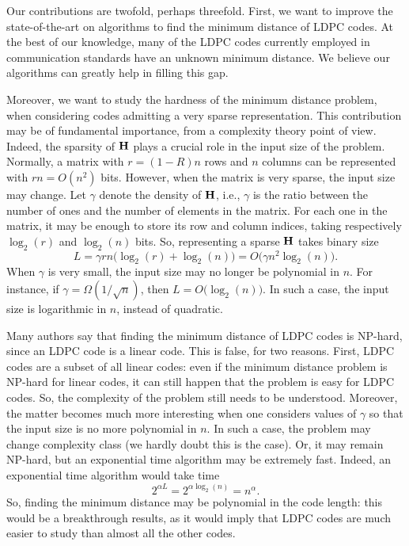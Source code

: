 Our contributions are twofold, perhaps threefold.
First, we want to improve the state-of-the-art on algorithms to find the minimum distance of LDPC codes.
At the best of our knowledge, many of the LDPC codes currently employed in communication standards have an unknown minimum distance.
We believe our algorithms can greatly help in filling this gap.

Moreover, we want to study the hardness of the minimum distance problem, when considering codes admitting a very sparse representation.
This contribution may be of fundamental importance, from a complexity theory point of view.
Indeed, the sparsity of $\mathbf H$ plays a crucial role in the input size of the problem.
Normally, a matrix with $r = (1-R)n$ rows and $n$ columns can be represented with $rn = O(n^2)$ bits.
However, when the matrix is very sparse, the input size may change.
Let $\gamma$ denote the density of $\mathbf H$, i.e., $\gamma$ is the ratio between the number of ones and the number of elements in the matrix.
For each one in the matrix, it may be enough to store its row and column indices, taking respectively $\log_2(r)$ and $\log_2(n)$ bits.
So, representing a sparse $\mathbf H$ takes binary size
$$L = \gamma rn \big(\log_2(r)+\log_2(n)\big) = O\big(\gamma n^2\log_2(n)\big).$$
When $\gamma$ is very small, the input size may no longer be polynomial in $n$.
For instance, if $\gamma = \Omega(1/\sqrt{n})$, then $L = O\big(\log_2(n)\big)$.
In such a case, the input size is logarithmic in $n$, instead of quadratic.

Many authors say that finding the minimum distance of LDPC codes is NP-hard, since an LDPC code is a linear code.
This is false, for two reasons.
First, LDPC codes are a subset of all linear codes: even if the minimum distance problem is NP-hard for linear codes, it can still happen that the problem is easy for LDPC codes.
So, the complexity of the problem still needs to be understood.
Moreover, the matter becomes much more interesting when one considers values of $\gamma$ so that the input size is no more polynomial in $n$.
In such a case, the problem may change complexity class (we hardly doubt this is the case).
Or, it may remain NP-hard, but an exponential time algorithm may be extremely fast.
Indeed, an exponential time algorithm would take time
$$2^{\alpha L} = 2^{\alpha \log_2(n)} = n^\alpha.$$
So, finding the minimum distance may be polynomial in the code length: this would be a breakthrough results, as it would imply that LDPC codes are much easier to study than almost all the other codes.

